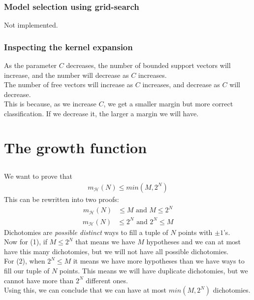 \documentclass[a4paper]{article}
\begin{document}
\subsubsection{Model selection using grid-search}
Not implemented.

\subsubsection{Inspecting the kernel expansion}
As the parameter $C$ decreases, the number of bounded support vectors will increase, and the number will decrease as $C$ increases. \\
The number of free vectors will increase as $C$ increases, and decrease as $C$ will decrease. \\
This is because, as we increase $C$, we get a smaller margin but more correct classification. If we decrease it, the larger a margin we will have.

\section{The growth function}
\subsection{}
We want to prove that
\begin{align*}
m_\mathcal{H}(N)\leq min(M,2^N)
\end{align*}
This can be rewritten into two proofs:
\begin{align}
m_\mathcal{H}(N)&\leq M \mbox{  and  }M\leq 2^N
\end{align}
\begin{align}
m_\mathcal{H}(N)&\leq 2^N \mbox{  and  }2^N\leq M
\end{align}
Dichotomies are \textit{possible distinct} ways to fill a tuple of $N$ points with $\pm 1$'s.\\
Now for (1), if $M\leq 2^N$ that means we have $M$ hypotheses and we can at most have this many dichotomies, but we will not have all possible dichotomies. \\
For (2), when $2^N \leq M$ it means we have more hypotheses than we have ways to fill our tuple of $N$ points. This means we will have duplicate dichotomies, but we cannot have more than $2^N$ different ones.\\
Using this, we can conclude that we can have at most $min(M, 2^N)$ dichotomies.
\end{document}
